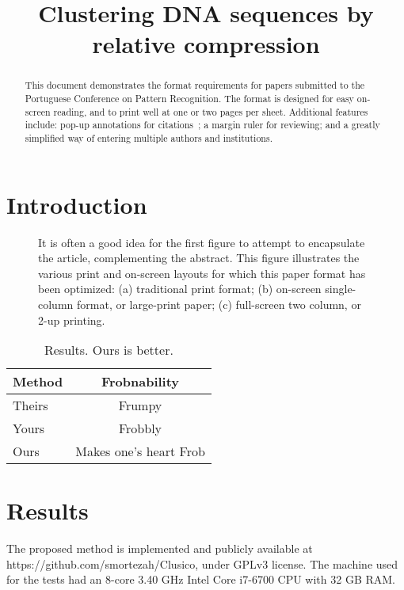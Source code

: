 \documentclass[extendedabs]{recpad2k}
\title{Clustering DNA sequences by relative compression}
\begin{document}
\maketitle

\begin{abstract}
This document demonstrates the format requirements for papers submitted
to the Portuguese Conference on Pattern Recognition.  The format is designed for
easy on-screen reading, and to print well at one or two pages per sheet.
Additional features include: pop-up annotations for
citations~\cite{Authors06,Mermin89}; a margin ruler for reviewing; and a
greatly simplified way of entering multiple authors and institutions.
\end{abstract}

\section{Introduction}

 \begin{figure*}
 \caption{It is often a good idea for the first figure to attempt to
 encapsulate the article, complementing the abstract.  This figure illustrates
 the various print and on-screen layouts for which this paper format has
 been optimized: (a) traditional print format; (b) on-screen
 single-column format, or large-print paper; (c) full-screen two column, or
 2-up printing. }
\label{fig:teaser}
\end{figure*}
  

\begin{table}
\begin{center}
\begin{tabular}{|l|c|}
\hline
Method & Frobnability \\
\hline\hline
Theirs & Frumpy \\
Yours & Frobbly \\
Ours & Makes one's heart Frob\\
\hline
\end{tabular}
\end{center}
\caption{Results.   Ours is better.}
\end{table}

\section{Results}
The proposed method is implemented and publicly available at https://github.com/smortezah/Clusico, under GPLv3 license. The machine used for the tests had an 8-core 3.40 GHz Intel\textsuperscript{\scriptsize\textregistered} Core{\scriptsize\texttrademark} i7-6700 CPU with 32 GB RAM.
\end{document}
